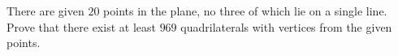 There are given $20$ points in the plane, no three of which lie on a single line. Prove that there exist at least $969$ quadrilaterals with vertices from the given points.